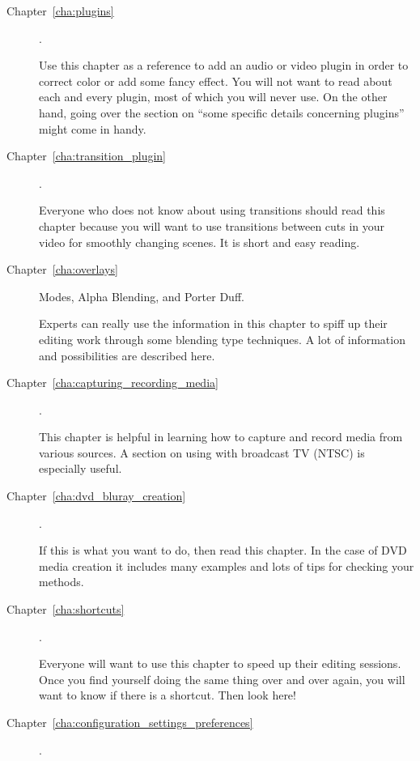 \begin{description}
    \item[Chapter~\ref{cha:plugins}].

        Use this chapter as a reference to add an audio or video plugin in order to correct color or add some fancy effect.
        You will not want to read about each and every plugin, most of which you will never use.
        On the other hand, going over the section on “some specific details concerning plugins” might come in handy.

    \item[Chapter~\ref{cha:transition_plugin}] .

        Everyone who does not know about using transitions should read this chapter because you will want to use transitions between cuts in your video for smoothly changing scenes.
        It is short and easy reading.

    \item[Chapter~\ref{cha:overlays}]  Modes, Alpha Blending, and Porter Duff.

        Experts can really use the information in this chapter to spiff up their editing work through some blending type techniques.
        A lot of information and possibilities are described here.

    \item[Chapter~\ref{cha:capturing_recording_media}] .

        This chapter is helpful in learning how to capture and record media from various sources.  A section on using \CGG{} with broadcast TV (NTSC) is especially useful.

    \item[Chapter~\ref{cha:dvd_bluray_creation}] .

        If this is what you want to do, then read this chapter.
        In the case of DVD media creation it includes many examples and lots of tips for checking your methods.

    \item[Chapter~\ref{cha:shortcuts}] .

        Everyone will want to use this chapter to speed up their editing sessions.
        Once you find yourself doing the same thing over and over again, you will want to know if there is a shortcut. Then look here!

    \item[Chapter~\ref{cha:configuration_settings_preferences}] .


\end{description}
